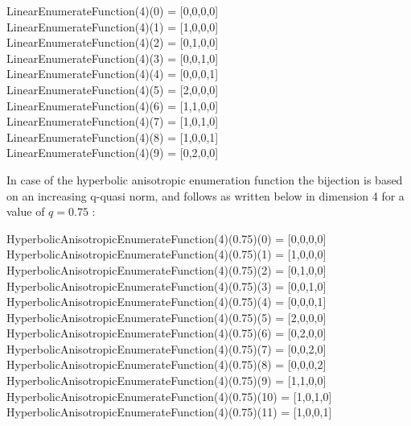 \begin{center}

  LinearEnumerateFunction(4)(0) = [0,0,0,0] \\
  LinearEnumerateFunction(4)(1) = [1,0,0,0] \\
  LinearEnumerateFunction(4)(2) = [0,1,0,0] \\
  LinearEnumerateFunction(4)(3) = [0,0,1,0] \\
  LinearEnumerateFunction(4)(4) = [0,0,0,1] \\
  LinearEnumerateFunction(4)(5) = [2,0,0,0] \\
  LinearEnumerateFunction(4)(6) = [1,1,0,0] \\
  LinearEnumerateFunction(4)(7) = [1,0,1,0] \\
  LinearEnumerateFunction(4)(8) = [1,0,0,1] \\
  LinearEnumerateFunction(4)(9) = [0,2,0,0] 

\end{center}

In case of the hyperbolic anisotropic enumeration function the bijection is based on an increasing q-quasi norm, and follows as written below in dimension 4 for a value of $q=0.75$ : 
\begin{center}
HyperbolicAnisotropicEnumerateFunction(4)(0.75)(0) = [0,0,0,0] \\
HyperbolicAnisotropicEnumerateFunction(4)(0.75)(1) = [1,0,0,0] \\
HyperbolicAnisotropicEnumerateFunction(4)(0.75)(2) = [0,1,0,0] \\
HyperbolicAnisotropicEnumerateFunction(4)(0.75)(3) = [0,0,1,0] \\
HyperbolicAnisotropicEnumerateFunction(4)(0.75)(4) = [0,0,0,1] \\
HyperbolicAnisotropicEnumerateFunction(4)(0.75)(5) = [2,0,0,0] \\
HyperbolicAnisotropicEnumerateFunction(4)(0.75)(6) = [0,2,0,0] \\
HyperbolicAnisotropicEnumerateFunction(4)(0.75)(7) = [0,0,2,0] \\
HyperbolicAnisotropicEnumerateFunction(4)(0.75)(8) = [0,0,0,2] \\
HyperbolicAnisotropicEnumerateFunction(4)(0.75)(9) = [1,1,0,0] \\
HyperbolicAnisotropicEnumerateFunction(4)(0.75)(10) = [1,0,1,0] \\
HyperbolicAnisotropicEnumerateFunction(4)(0.75)(11) = [1,0,0,1] \\
\end{center}

